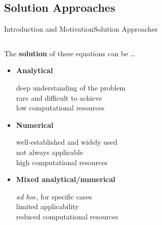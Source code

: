 \subsection{Solution Approaches}

\begin{frame}{Introduction and Motivation}{Solution Approaches}
  \begin{columns}
    \begin{column}[c]{0.45\textwidth}
      The \textbf{solution} of these equations can be \dots \\
      \begin{itemize}[<+->]
        \item \textbf{Analytical} \\
        \begin{small}
          \qquad \textcolor{mycolor2!95!black}{deep understanding of the problem} \\
          \qquad \textcolor{mycolor2!95!black}{rare and difficult to achieve} \\
          \qquad \textcolor{mycolor5!95!black}{low computational resources}
        \end{small}
        \item \textbf{Numerical} \\
        \begin{small}
          \qquad \textcolor{mycolor5!95!black}{well-established and widely used} \\
          \qquad \textcolor{mycolor3!95!black}{not always applicable} \\
          \qquad \textcolor{mycolor2!95!black}{high computational resources}
        \end{small}
        \item \textbf{Mixed analytical/numerical} \\
        \begin{small}
          \qquad \textcolor{mycolor3!95!black}{\emph{ad hoc}, for specific cases} \\
          \qquad \textcolor{mycolor3!95!black}{limited applicability} \\
          \qquad \textcolor{mycolor3!95!black}{reduced computational resources}
        \end{small}
      \end{itemize}
    \end{column}

\end{columns}
\end{frame}
